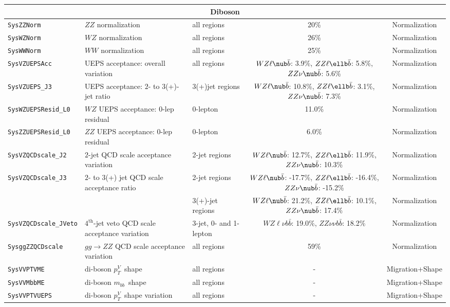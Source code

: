 \begin{table}
{\begin{tabular}{l|llcc}
\hline
\hline
\multicolumn{5}{c}{Diboson}\\
\hline
\texttt{SysZZNorm}    & $ZZ$ normalization 	&  all regions  & 20\%	&Normalization\\
\texttt{SysWZNorm}    & $WZ$ normalization 	&  all regions	& 26\%	&Normalization\\
\texttt{SysWWNorm}    & $WW$ normalization 	&  all regions	& 25\%	&Normalization\\
\hline
\texttt{SysVZUEPSAcc} & UEPS acceptance: overall variation &  all regions & $WZ\ell\nub\bar{b}$: 3.9\%, $ZZ\ell\ellb\bar{b}$: 5.8\%, $ZZ\nu\nub\bar{b}$: 5.6\% & Normalization\\
\texttt{SysVZUEPS\_J3} & UEPS acceptance: $2$- to $3$(+)-jet ratio & 3(+)jet regions & $WZ\ell\nub\bar{b}$: 10.8\%, $ZZ\ell\ellb\bar{b}$: 3.1\%, $ZZ\nu\nub\bar{b}$: 7.3\% & Normalization\\
\texttt{SysWZUEPSResid\_L0} & $WZ$ UEPS acceptance: $0$-lep residual & $0$-lepton & 11.0\% & Normalization\\
\texttt{SysZZUEPSResid\_L0} & $ZZ$ UEPS acceptance: $0$-lep residual & $0$-lepton & 6.0\% & Normalization\\
\texttt{SysVZQCDscale\_J2} & $2$-jet QCD scale acceptance variation & 2-jet regions & $WZ\ell\nub\bar{b}$: 12.7\%, $ZZ\ell\ellb\bar{b}$: 11.9\%, $ZZ\nu\nub\bar{b}$: 10.3\% & Normalization\\
\texttt{SysVZQCDscale\_J3}
            & $2$- to $3$(+) jet QCD scale acceptance ratio & 2-jet regions   & $WZ\ell\nub\bar{b}$: -17.7\%, $ZZ\ell\ellb\bar{b}$: -16.4\%, $ZZ\nu\nub\bar{b}$: -15.2\% & Normalization\\
                                                         &  & 3(+)-jet regions & $WZ\ell\nub\bar{b}$: 21.2\%, $ZZ\ell\ellb\bar{b}$: 10.1\%, $ZZ\nu\nub\bar{b}$: 17.4\% & Normalization\\
\texttt{SysVZQCDscale\_JVeto} & $4^{\text{th}}$-jet veto QCD scale acceptance variation & 3-jet, 0- and 1-lepton & $WZ \ell \nu b \bar{b}$: 19.0\%, $ZZ\nu \nu b\bar{b}$: 18.2\% & Normalization\\
\texttt{SysggZZQCDscale} & $gg\to ZZ$ QCD scale acceptance variation & all regions & 59\% & Normalization\\
\hline
\texttt{SysVVPTVME} & di-boson $p_T^V$\ shape & all regions & - & Migration+Shape \\ 
\texttt{SysVVMbbME} & di-boson $m_{bb}$\ shape & all regions & - & Migration+Shape \\ 
\texttt{SysVVPTVUEPS} & di-boson $p_T^V$\ shape variation & all regions & - & Migration+Shape \\

\end{tabular}}
\end{table}
